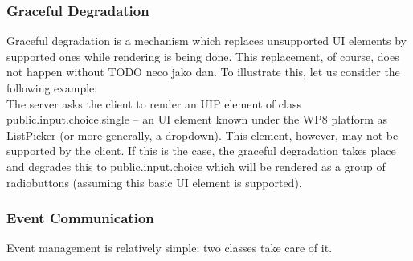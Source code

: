 \subsubsection{Graceful Degradation}
Graceful degradation is a mechanism which replaces unsupported UI elements by supported ones while rendering is being done. This replacement, of course, does not happen without TODO neco jako dan. To illustrate this, let us consider the following example:\\
The server asks the client to render an UIP element of class public.input.choice.single – an UI element known under the WP8 platform as ListPicker (or more generally, a dropdown). This element, however, may not be supported by the client. If this is the case, the graceful degradation takes place and degrades this to public.input.choice which will be rendered as a group of radiobuttons (assuming this basic UI element is supported).

\subsubsection{Event Communication}
Event management is relatively simple: two classes take care of it.
